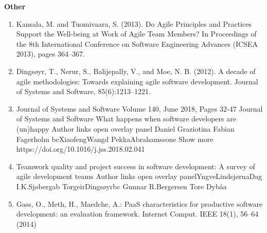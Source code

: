 \documentclass[english, 12pt, a4paper, sci, utf8, a-1b, online]{aaltothesis}
\begin{document}
\textbf{Other}
\begin{enumerate}
  \item Kansala, M. and Tuomivaara, S. (2013). Do Agile Principles and Practices Support the Well-being at Work of Agile Team Members? In Proceedings of the 8th International Conference on Software Engineering Advances (ICSEA 2013), pages 364–367.
  \item Dingsøyr, T., Nerur, S., Balijepally, V., and Moe, N. B. (2012). A decade of agile methodologies: Towards explaining agile software development. Journal of Systems and Software, 85(6):1213–1221.
  \item Journal of Systems and Software Volume 140, June 2018, Pages 32-47 Journal of Systems and Software What happens when software developers are (un)happy Author links open overlay panel Daniel Graziotina Fabian Fagerholm bcXiaofengWangd PekkaAbrahamssone Show more https://doi.org/10.1016/j.jss.2018.02.041
  \item Teamwork quality and project success in software development: A survey of agile development teams Author links open overlay panelYngveLindsjørnaDag I.K.Sjøbergab TorgeirDingsøyrbc Gunnar R.Bergersen Tore Dybåa
  \item Gass, O., Meth, H., Maedche, A.: PaaS characteristics for productive software development: an evaluation framework. Internet Comput. IEEE 18(1), 56–64 (2014)
\end{enumerate}

\clearpage
\thesisbibliography


\end{document}
